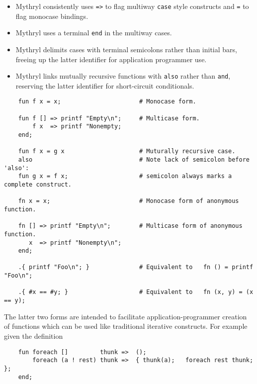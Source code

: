\begin{itemize}

\item Mythryl consistently uses {\tt =>} to flag multiway {\tt case} 
style constructs and {\tt =} to flag monocase bindings.

\item Mythryl uses a terminal {\tt end} in the multiway cases.

\item Mythryl delimits cases with terminal semicolons rather than initial bars, 
freeing up the latter identifier for application programmer use.

\item Mythryl links mutually recursive functions with {\tt also} rather than 
{\tt and}, reserving the latter identifier for short-circuit conditionals.
\end{itemize}

\begin{verbatim}
    fun f x = x;                      # Monocase form.

    fun f [] => printf "Empty\n";     # Multicase form.
        f x  => printf "Nonempty;
    end;

    fun f x = g x                     # Muturally recursive case.
    also                              # Note lack of semicolon before 'also':
    fun g x = f x;                    # semicolon always marks a complete construct.

    fn x = x;                         # Monocase form of anonymous function.

    fn [] => printf "Empty\n";        # Multicase form of anonymous function.
       x  => printf "Nonempty\n";
    end;

    .{ printf "Foo\n"; }              # Equivalent to   fn () = printf "Foo\n";

    .{ #x == #y; }                    # Equivalent to   fn (x, y) = (x == y);
\end{verbatim}

The latter two forms are intended to facilitate application-programmer 
creation of functions which can be used like traditional iterative 
constructs.  For example given the definition

\begin{verbatim}
    fun foreach []         thunk =>  ();
        foreach (a ! rest) thunk =>  { thunk(a);   foreach rest thunk; };
    end;
\end{verbatim}

